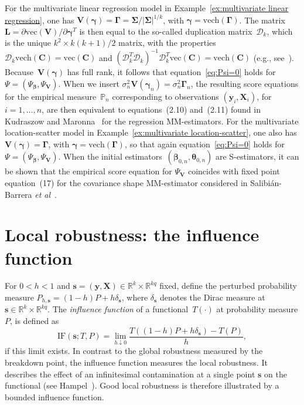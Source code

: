 \documentclass{article}
\numberwithin{equation}{section}
\theoremstyle{plain}
\newcommand{\R}{\mathbb{R}}
\newcommand{\vc}{\mathrm{vec}}
\newcommand{\vch}{\mathrm{vech}}
\newcommand{\bbeta}{\bm\beta}
\newcommand{\btheta}{\bm\theta}
\newcommand{\bgamma}{\bm\gamma}
\newcommand{\bSigma}{\mathbf{\Sigma}}
\newcommand{\bGamma}{\bm\Gamma}
\newcommand{\by}{\mathbf{y}}
\newcommand{\bs}{\mathbf{s}}
\newcommand{\bX}{\mathbf{X}}
\newcommand{\bV}{\mathbf{V}}
\newcommand{\bC}{\mathbf{C}}
\newcommand{\bL}{\mathbf{L}}
\begin{document}
For the multivariate linear regression model in Example~\ref{ex:multivariate linear regression}, 
one has $\bV(\bgamma)=\bGamma=\bSigma/|\bSigma|^{1/k}$, with $\bgamma=\vch(\bGamma)$.
The matrix $\bL=\partial\vc(\bV)/\partial\bgamma^T$ is then equal to the so-called duplication matrix~$\mathcal{D}_k$,
which is the unique $k^2\times k(k+1)/2$ matrix, with the properties
$\mathcal{D}_k\vch(\bC)=\vc(\bC)$ and $(\mathcal{D}_k^T\mathcal{D}_k)^{-1}\mathcal{D}_k^T\vc(\bC)=\vch(\bC)$
(e.g., see~\cite[Ch.~3, Sec.~8]{magnus&neudecker1988}).
Because~$\bV(\bgamma)$ has full rank, it follows that equation~\eqref{eq:Psi=0} holds for $\Psi=(\Psi_{\bbeta},\Psi_{\bV})$.
When we insert $\sigma_n^2\bV(\bgamma_n)=\sigma_n^2\bGamma_n$, the resulting score equations for the empirical measure~$\mathbb{P}_n$ corresponding to observations
$(\by_i,\bX_i)$, for $i=1,\ldots,n$, are then equivalent to 
equations~(2.10) and~(2.11) found in
Kudraszow and Maronna~\cite{kudraszow-maronna2011} for the regression MM-estimators.
For the multivariate location-scatter model in Example~\ref{ex:multivariate location-scatter}, 
one also has  $\bV(\bgamma)=\bGamma$, with
$\bgamma=\vch(\bGamma)$,
so that again equation~\eqref{eq:Psi=0} holds for $\Psi=(\Psi_{\bbeta},\Psi_{\bV})$.
When the initial estimators~$(\bbeta_{0,n},\btheta_{0,n})$ are S-estimators, 
it can be shown that the empirical score equation for $\Psi_{\bV}$
coincides with fixed point equation~(17) for the covariance shape MM-estimator 
considered in Salibi\'an-Barrera \textit{et al}~\cite{SalibianBarrera-VanAelst-Willems2006}.

\section{Local robustness: the influence function}
\label{sec:IF}
For $0<h<1$ and $\bs=(\by,\bX)\in\R^k\times\R^{kq}$ fixed, define the perturbed probability measure
$P_{h,\bs}=(1-h)P+h\delta_{\bs}$,
where $\delta_{\bs}$ denotes the Dirac measure at $\bs\in\R^k\times\R^{kq}$.
The \emph{influence function} of a functional~$T(\cdot)$ at probability measure $P$,
is defined as
\begin{equation}
\label{def:IF}
\text{IF}(\bs;T,P)
=
\lim_{h\downarrow0}
\frac{T((1-h)P+h\delta_{\bs})-T(P)}{h},
\end{equation}
if this limit exists.
In contrast to the global robustness measured by the breakdown point,
the influence function measures the local robustness.
It describes the effect of an infinitesimal contamination at a single point $\bs$ on the functional
(see Hampel~\cite{hampel1974}).
Good local robustness is therefore illustrated by a bounded influence function.
\end{document}
